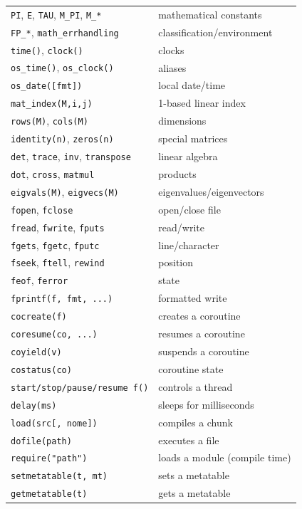 \documentclass[11pt,a4paper,oneside]{report}
\newcommand{\code}[1]{\texttt{#1}}
\begin{document}
\begin{longtable}{@{}L{4.8cm}L{10.5cm}@{}}
\code{PI}, \code{E}, \code{TAU}, \code{M\_PI}, \code{M\_*} & mathematical constants \\
\code{FP\_*}, \code{math\_errhandling} & classification/environment \\
\midrule
\code{time()}, \code{clock()} & clocks \\
\code{os\_time()}, \code{os\_clock()} & aliases \\
\code{os\_date([fmt])} & local date/time \\
\midrule
\code{mat\_index(M,i,j)} & 1-based linear index \\
\code{rows(M)}, \code{cols(M)} & dimensions \\
\code{identity(n)}, \code{zeros(n)} & special matrices \\
\code{det}, \code{trace}, \code{inv}, \code{transpose} & linear algebra \\
\code{dot}, \code{cross}, \code{matmul} & products \\
\code{eigvals(M)}, \code{eigvecs(M)} & eigenvalues/eigenvectors \\
\midrule
\code{fopen}, \code{fclose} & open/close file \\
\code{fread}, \code{fwrite}, \code{fputs} & read/write \\
\code{fgets}, \code{fgetc}, \code{fputc} & line/character \\
\code{fseek}, \code{ftell}, \code{rewind} & position \\
\code{feof}, \code{ferror} & state \\
\code{fprintf(f, fmt, ...)} & formatted write \\
\midrule
\code{cocreate(f)} & creates a coroutine \\
\code{coresume(co, ...)} & resumes a coroutine \\
\code{coyield(v)} & suspends a coroutine \\
\code{costatus(co)} & coroutine state \\
\code{start/stop/pause/resume f()} & controls a thread \\
\code{delay(ms)} & sleeps for milliseconds \\
\midrule
\code{load(src[, nome])} & compiles a chunk \\
\code{dofile(path)} & executes a file \\
\code{require("path")} & loads a module (compile time) \\
\midrule
\code{setmetatable(t, mt)} & sets a metatable \\
\code{getmetatable(t)} & gets a metatable \\

\end{longtable}
\end{document}
